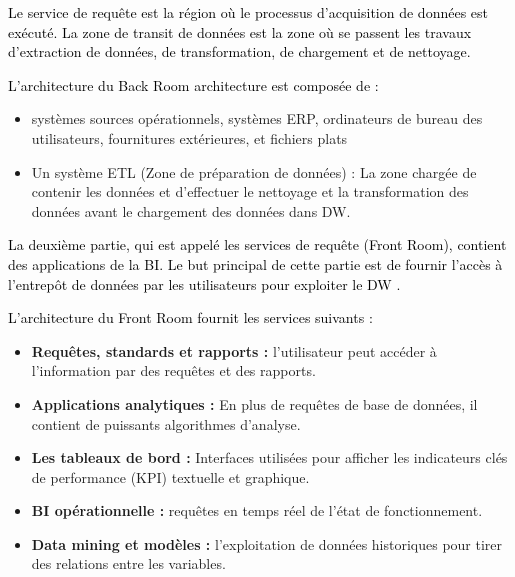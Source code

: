 \documentclass[a4paper,12pt]{report}
\begin{document}
 
\textcolor{black}{Le service de requête est la région où le processus d'acquisition de données est exécuté. La zone de transit de données est la zone où se passent les travaux d'extraction de données, de transformation, de chargement et de nettoyage.}

\textcolor{black}{L’architecture du  Back Room architecture est composée de \citep{kimball2008data}:}

\begin{itemize}

\item systèmes sources  opérationnels, systèmes ERP, ordinateurs de bureau des utilisateurs, fournitures extérieures, et fichiers plats

\item 	Un système ETL (Zone de préparation de données) : La zone chargée de contenir les données et d'effectuer le nettoyage et la transformation des données avant le chargement des données dans DW.

\end{itemize}

\textcolor{black}{La deuxième partie, qui est appelé les services de requête (Front Room), contient des applications de la BI. Le but principal de cette partie est de fournir l'accès à l'entrepôt de données par les utilisateurs pour exploiter le DW \citep{kimball2008data}.}

\textcolor{black}{L'architecture du Front Room fournit les services suivants \citep{kimball2008data}:}


\begin{itemize}

\item	\textbf{Requêtes, standards et rapports :} l'utilisateur peut accéder à l'information par des requêtes et des rapports.

\item	\textbf{Applications analytiques :} En plus de requêtes de base de données, il contient de puissants algorithmes d'analyse.

\item	\textbf{Les tableaux de bord :} Interfaces utilisées pour afficher les indicateurs clés de performance (KPI) textuelle et graphique.

\item \textbf{BI opérationnelle :}	 requêtes en temps réel de l'état de fonctionnement.

\item \textbf{Data mining et modèles :}	 l’exploitation de données historiques pour tirer des relations entre les variables.

\end{itemize}
\end{document}
